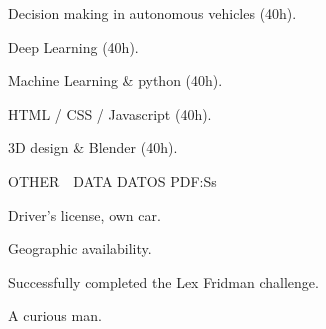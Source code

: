 \documentclass[letterpaper,MMMyyyy,nonstopmode]{simpleresumecv}
\begin{document}
\begin{Body}
\Gap

Decision making in autonomous vehicles (40h).

\Gap

Deep Learning (40h).

\Gap

Machine Learning \& python (40h).

\Gap

HTML / CSS / Javascript (40h).


\Gap

3D design \& Blender (40h).


\Gap

\hfill


\Section
{OTHER\ \  DATA}
{DATOS }
{PDF:Ss}

\Entry

Driver's license, own car.

\Gap

Geographic availability.

\Gap

Successfully completed the Lex Fridman challenge.

\Gap

A curious man.


\end{Body}

\end{document}

